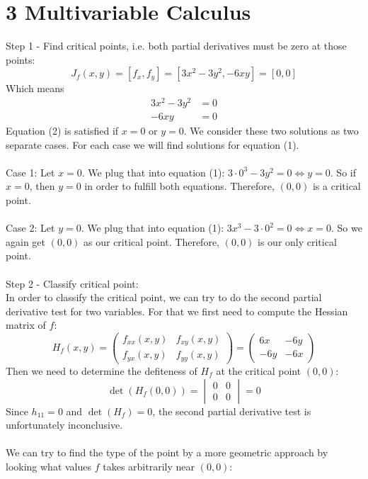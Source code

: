\documentclass{article}
\begin{document}
\section*{3 Multivariable Calculus}
Step 1 - Find critical points, i.e. both partial derivatives must be zero at those points:
$$J_f (x, y) = [f_x, f_y] = [3x^2 - 3y^2, -6xy] = [0, 0]$$
Which means
\begin{align}
3x^2 - 3y^2 &= 0\\
-6xy &= 0
\end{align}
Equation (2) is satisfied if $x=0$ or $y=0$. We consider these two solutions as two separate cases. For each case we will find solutions for equation (1).\\
\\
Case 1: Let $x=0$. We plug that into equation (1): $3 \cdot 0^3 - 3 y^2 = 0 \Leftrightarrow y = 0$. So if $x=0$, then $y=0$ in order to fulfill both equations. Therefore, $(0, 0)$ is a critical point.\\
\\
Case 2: Let $y=0$. We plug that into equation (1): $3 x^3 - 3 \cdot 0^2 = 0 \Leftrightarrow x = 0$. So we again get $(0, 0)$ as our critical point. Therefore, $(0,0)$ is our only critical point.\\
\\
Step 2 - Classify critical point:\\
In order to classify the critical point, we can try to do the second partial derivative test for two variables. For that we first need to compute the Hessian matrix of $f$:
$$H_f (x, y) = \begin{pmatrix}f_{xx}(x, y) & f_{xy}(x, y) \\ f_{yx}(x, y) & f_{yy}(x, y)\end{pmatrix} = \begin{pmatrix}6x & -6y \\ -6y & -6x\end{pmatrix}$$
Then we need to determine the defiteness of $H_f$ at the critical point $(0, 0)$:
$$\det(H_f(0, 0)) = \begin{vmatrix} 0 & 0 \\ 0 & 0 \end{vmatrix} = 0$$
Since $h_{11} = 0$ and $\det(H_f) = 0$, the second partial derivative test is unfortunately inconclusive.\\
\\
We can try to find the type of the point by a more geometric approach by looking what values $f$ takes arbitrarily near $(0,0)$:\\
\end{document}
